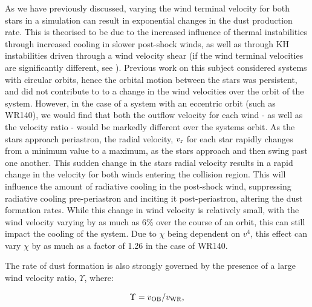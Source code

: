 As we have previously discussed, varying the wind terminal velocity for both stars in a simulation can result in exponential changes in the dust production rate.
This is theorised to be due to the increased influence of thermal instabilities through increased cooling in slower post-shock winds, as well as through KH instabilities driven through a wind velocity shear (if the wind terminal velocities are significantly different, see \cite{stevens_colliding_1992}).
Previous work on this subject considered systems with circular orbits, hence the orbital motion between the stars was persistent, and did not contribute to to a change in the wind velocities over the orbit of the system.
However, in the case of a system with an eccentric orbit (such as WR140), we would find that both the outflow velocity for each wind - as well as the velocity ratio - would be markedly different over the systems orbit.
As the stars approach periastron, the radial velocity, $v_\text{r}$ for each star rapidly changes from a minimum value to a maximum, as the stars approach and then swing past one another.
This sudden change in the stars radial velocity results in a rapid change in the velocity for both winds entering the collision region.
This will influence the amount of radiative cooling in the post-shock wind, suppressing radiative cooling pre-periastron and inciting it post-periastron, altering the dust formation rates. 
While this change in wind velocity is relatively small, with the wind velocity varying by as much as 6\% over the course of an orbit, this can still impact the cooling of the system.
Due to $\chi$ being dependent on $v^4$, this effect can vary $\chi$ by as much as a factor of 1.26 in the case of WR140.

The rate of dust formation is also strongly governed by the presence of a large wind velocity ratio, $\Upsilon$, where:

\begin{equation}
  \Upsilon = v_\text{OB} / v_\text{WR}, 
\end{equation}

